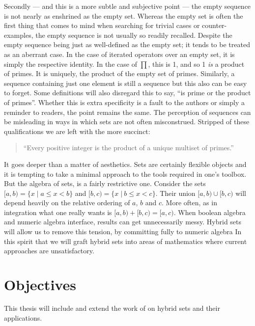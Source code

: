 Secondly --- and this is a more subtle and subjective point --- 
the empty sequence is not nearly as enshrined as the empty set.
Whereas the empty set is often the first thing that comes to mind when searching for trivial cases or counter-examples,
the empty sequence is not usually so readily recalled.
Despite the empty sequence being just as well-defined as the empty set; it tends to be treated as an aberrant case.
In the case of iterated operators over an empty set, it is simply the respective identity.
In the case of $\prod$, this is 1, and so 1 \emph{is} a product of primes.
It is uniquely, the product of the empty set of primes.
Similarly, a sequence containing just one element is still a sequence but this also can be easy to forget.
Some definitions will also disregard this to say, ``is prime or the product of primes''. 
Whether this is extra specificity is a fault to the authors or simply a reminder to readers, the point remains the same.
The perception of sequences can be misleading in ways in which sets are not often misconstrued.
Stripped of these qualifications we are left with the more succinct:
\begin{quote}
	``Every positive integer is the product of a unique multiset of primes.''
\end{quote}


It goes deeper than a matter of aesthetics. 
Sets are certainly flexible objects and it is tempting to take a minimal approach to the tools required in one's toolbox.
But the algebra of sets, is a fairly restrictive one.
Consider the sets $[a,b) = \{ x \; |\; a \leq x < b \}$ and $[b,c) = \{ x \;|\: b \leq x < c \}$.
Their union $[a,b) \cup [b,c)$ will depend heavily on the relative ordering of $a$, $b$ and $c$. 
More often, as in integration what one really wants is $[a,b) + [b,c) = [a,c)$.
When boolean algebra and numeric algebra interface, results can get unnecessarily messy.
Hybrid sets will allow us to remove this tension, by committing fully to numeric algebra
In this spirit that we will graft hybrid sets into areas of mathematics where current approaches are unsatisfactory.





\section{Objectives}


This thesis will include and extend the work of \cite{carette2010} on hybrid sets and their applications.



